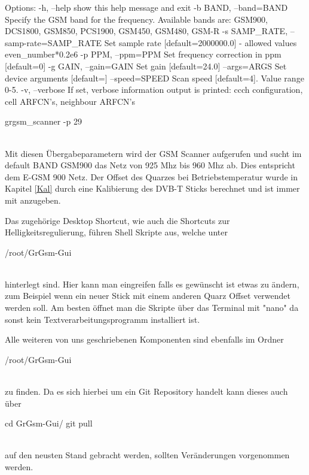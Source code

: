 \begin{code}
Options:
  -h, --help            show this help message and exit
  -b BAND, --band=BAND  Specify the GSM band for the frequency. Available
                        bands are: GSM900, DCS1800, GSM850, PCS1900, GSM450,
                        GSM480, GSM-R
  -s SAMP_RATE, --samp-rate=SAMP_RATE
                        Set sample rate [default=2000000.0] - allowed values
                        even_number*0.2e6
  -p PPM, --ppm=PPM     Set frequency correction in ppm [default=0]
  -g GAIN, --gain=GAIN  Set gain [default=24.0]
  --args=ARGS           Set device arguments [default=]
  --speed=SPEED         Scan speed [default=4]. Value range 0-5.
  -v, --verbose         If set, verbose information output is printed: ccch
                        configuration, cell ARFCN's, neighbour ARFCN's
                        
                   
grgsm_scanner -p 29 
\end{code}
\noindent\\Mit diesen Übergabeparametern wird der \ac{GSM} Scanner aufgerufen und sucht im default BAND GSM900 das Netz von 925 Mhz bis 960 Mhz ab. Dies entspricht dem E-GSM 900 Netz. Der Offset des Quarzes bei Betriebstemperatur wurde in Kapitel \ref{Kal} durch eine Kalibierung des DVB-T Sticks berechnet und ist immer mit anzugeben. 

Das zugehörige Desktop Shortcut, wie auch die Shortcuts zur Helligkeitsregulierung, führen Shell Skripte aus, welche unter 
\begin{code}
/root/GrGsm-Gui
\end{code}
\noindent\\hinterlegt sind. Hier kann man eingreifen falls es gewünscht ist etwas zu ändern, zum Beispiel wenn ein neuer Stick mit einem anderen Quarz Offset verwendet werden soll. Am besten öffnet man die Skripte über das Terminal mit "nano" da sonst kein Textverarbeitungsprogramm installiert ist. 

Alle weiteren von uns geschriebenen Komponenten sind ebenfalls im Ordner 
\begin{code}
/root/GrGsm-Gui
\end{code}
\noindent\\zu finden. Da es sich hierbei um ein Git Repository handelt kann dieses auch über 
\begin{code}
cd GrGsm-Gui/
git pull
\end{code}
\noindent\\auf den neusten Stand gebracht werden, sollten Veränderungen vorgenommen werden. 

